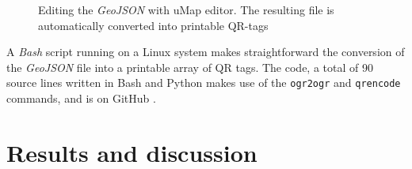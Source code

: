\documentclass[sustainability,article,submit,pdftex,moreauthors]{Definitions/mdpi}
\begin{document}
\begin{figure}
\hfill
{}
\caption{Editing the \emph{GeoJSON} with uMap editor. The resulting file is automatically converted into printable QR-tags}
\label{fig:editing}
\end{figure}

A \emph{Bash} script running on a Linux system makes straightforward the conversion of the \emph{GeoJSON} file into a printable array of QR tags. The code, a total of 90 source lines written in Bash and Python makes use of the \texttt{ogr2ogr} and \texttt{qrencode} commands, and is on GitHub .

\section{Results and discussion \label{sec:results}}
\end{document}
